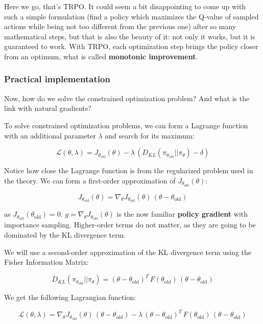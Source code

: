 \documentclass[
  letterpaper,
  DIV=11,
  numbers=noendperiod]{scrreprt}
\begin{document}
Here we go, that's TRPO. It could seem a bit disappointing to come up
with such a simple formulation (find a policy which maximizes the
Q-value of sampled actions while being not too different from the
previous one) after so many mathematical steps, but that is also the
beauty of it: not only it works, but it is guaranteed to work. With
TRPO, each optimization step brings the policy closer from an optimum,
what is called \textbf{monotonic improvement}.

\hypertarget{practical-implementation}{%
\subsubsection*{Practical
implementation}\label{practical-implementation}}

Now, how do we solve the constrained optimization problem? And what is
the link with natural gradients?

To solve constrained optimization problems, we can form a Lagrange
function with an additional parameter \(\lambda\) and search for its
maximum:

\[
    \mathcal{L}(\theta, \lambda) = J_{\theta_\text{old}}(\theta)  - \lambda \, (D_{KL}(\pi_{\theta_\text{old}} || \pi_\theta) - \delta)
\]

Notice how close the Lagrange function is from the regularized problem
used in the theory. We can form a first-order approximation of
\(J_{\theta_\text{old}}(\theta)\):

\[
    J_{\theta_\text{old}}(\theta) = \nabla_\theta J_{\theta_\text{old}}(\theta) \, (\theta- \theta_\text{old})
\]

as \(J_{\theta_\text{old}}(\theta_\text{old}) = 0\).
\(g = \nabla_\theta J_{\theta_\text{old}}(\theta)\) is the now familiar
\textbf{policy gradient} with importance sampling. Higher-order terms do
not matter, as they are going to be dominated by the KL divergence term.

We will use a second-order approximation of the KL divergence term using
the Fisher Information Matrix:

\[
    D_{KL}(\pi_{\theta_\text{old}} || \pi_\theta) = (\theta- \theta_\text{old})^T \, F(\theta_\text{old}) \,  (\theta- \theta_\text{old})
\]

We get the following Lagrangian function:

\[
    \mathcal{L}(\theta, \lambda) = \nabla_\theta J_{\theta_\text{old}}(\theta) \, (\theta- \theta_\text{old})  - \lambda \, (\theta- \theta_\text{old})^T \, F(\theta_\text{old}) \,  (\theta- \theta_\text{old})
\]
\end{document}
